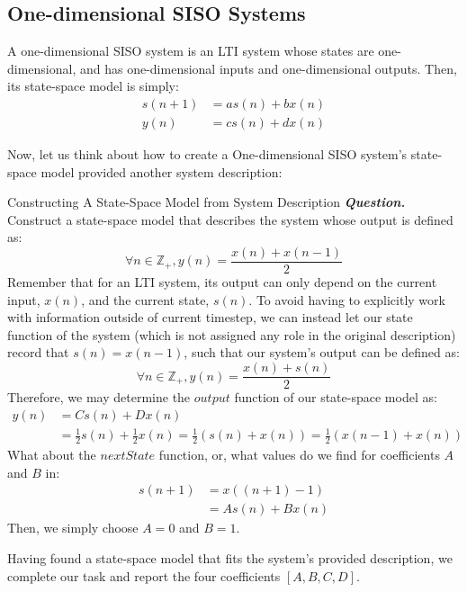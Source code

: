 \subsection{One-dimensional SISO Systems}
A one-dimensional SISO system is an LTI system whose states are one-dimensional, and has one-dimensional inputs and one-dimensional outputs.
Then, its state-space model is simply:
\begin{align*}
    s(n+1) &= a s(n) + b x(n) \\
    y(n) &= c s(n) + d x(n)
\end{align*}

Now, let us think about how to create a One-dimensional SISO system's state-space model provided another system description:
\begin{ln-example}{Constructing A State-Space Model from System Description}{}
    \textbf{\textit{Question.}} Construct a state-space model that describes the system whose output is defined as:
    \[
        \forall n \in \mathbb{Z}_+, y(n) = \frac{x(n) + x(n - 1)}{2}
    \]
    \tcblower
    Remember that for an LTI system, its output can only depend on the current input, $x(n)$, and the current state, $s(n)$.
    To avoid having to explicitly work with information outside of current timestep, we can instead let our state function of the system (which is not assigned any role in the original description) record that $s(n) = x(n - 1)$, such that our system's output can be defined as:
    \[
        \forall n \in \mathbb{Z}_+, y(n) = \frac{x(n) + s(n)}{2}
    \]
    Therefore, we may determine the $output$ function of our state-space model as:
    \begin{align*}
        y(n)
        &= C s(n) + D x(n) \\
        &= \frac{1}{2} s(n) + \frac{1}{2} x(n)
        = \frac{1}{2} (s(n) + x(n)) = \frac{1}{2} (x(n - 1) + x(n))
    \end{align*}
    What about the $nextState$ function, or, what values do we find for coefficients $A$ and $B$ in:
    \begin{align*}
        s(n + 1)
        &= x((n + 1) - 1) \\
        &= A s(n) + B x(n)
    \end{align*}
    Then, we simply choose $A = 0$ and $B = 1$.
    
    Having found a state-space model that fits the system's provided description, we complete our task and report the four coefficients $[A, B, C, D]$.
\end{ln-example}

